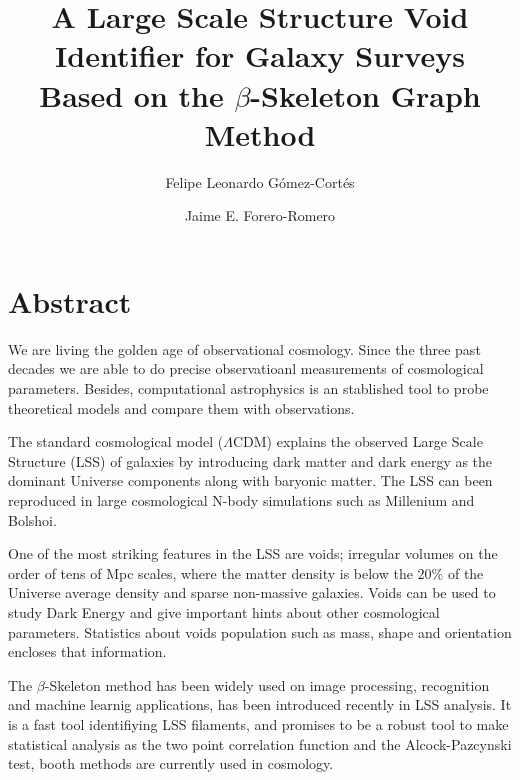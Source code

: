 \documentclass[manuscript]{aastex62}
\begin{document}
\title{A Large Scale Structure Void Identifier for Galaxy Surveys
  Based on the $\beta$-Skeleton Graph Method}


\author{Felipe Leonardo G\'omez-Cort\'es}

\nocollaboration


\author{Jaime E. Forero-Romero}


\section*{Abstract}

  We are living the golden age of observational cosmology. Since the three past decades
  we are able to do precise observatioanl measurements of cosmological parameters. 
  Besides, computational astrophysics is an stablished tool to probe theoretical 
  models and compare them with observations.

  The standard cosmological model ($\Lambda$CDM) explains the observed
  Large Scale Structure (LSS) of galaxies by introducing dark matter and
  dark energy as the dominant Universe components along with baryonic matter.
  The LSS can been reproduced in large cosmological N-body simulations
  such as Millenium and Bolshoi.

  One of the most striking features in the LSS are voids; irregular 
  volumes on the order of tens of Mpc scales, where the matter density is below the $20\%$ of the Universe
  average density and sparse non-massive galaxies. Voids can be used 
  to study Dark Energy and give important hints about other
  cosmological parameters. Statistics about voids population such as
  mass, shape and orientation encloses that information.

  The $\beta$-Skeleton method has been widely used on image processing,
  recognition and machine learnig applications, has been introduced
  recently in LSS analysis. It is a fast tool identifiying LSS filaments,
  and promises to be a robust tool to make statistical analysis
  as the two point correlation function and the Alcock-Pazcynski test,
  booth methods are currently used in cosmology.
\end{document}
